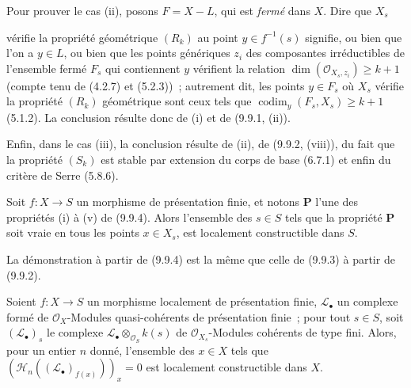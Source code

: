Pour prouver le cas (ii), posons $F=X-L$, qui est \emph{fermé} dans $X$. Dire
que $X_s$


vérifie la propriété géométrique $(R_k)$ au point $y\in f^{-1}(s)$ signifie, ou
bien que l'on a $y\in L$, ou bien que les points génériques $z_i$ des
composantes irréductibles de l'ensemble fermé $F_s$ qui contiennent $y$
vérifient la relation $\dim(\mathcal O_{X_s,z_i})\geq k+1$ (compte tenu de
(4.2.7) et (5.2.3))~; autrement dit, les points $y\in F_s$ où $X_s$ vérifie la
propriété $(R_k)$ géométrique sont ceux tels que
$\operatorname{codim}_y(F_s,X_s)\geq k+1$ (5.1.2). La conclusion résulte donc
de (i) et de (9.9.1, (ii)).

Enfin, dans le cas (iii), la conclusion résulte de (ii), de (9.9.2, (viii)), du
fait que la propriété $(S_k)$ est stable par extension du corps de base (6.7.1)
et enfin du critère de Serre (5.8.6).

\begin{corollary}[9.9.5]
\label{IV.9.9.5-fr}
Soit $f:X\to S$ un morphisme de présentation finie, et notons $\mathbf P$
l'une des propriétés (i) à (v) de (9.9.4). Alors l'ensemble des $s\in S$ tels
que la propriété $\mathbf P$ soit vraie en tous les points $x\in X_s$, est
localement constructible dans $S$.
\end{corollary}

La démonstration à partir de (9.9.4) est la même que celle de (9.9.3) à partir
de (9.9.2).

\begin{proposition}[9.9.6]
\label{IV.9.9.6-fr}
Soient $f:X\to S$ un morphisme localement de présentation finie,
$\mathcal L_\bullet$ un complexe formé de $\mathcal O_X$-Modules
quasi-cohérents de présentation finie~; pour tout $s\in S$, soit
$(\mathcal L_\bullet)_s$ le complexe
$\mathcal L_\bullet\otimes_{\mathcal O_S}k(s)$ de
$\mathcal O_{X_s}$-Modules cohérents de type fini. Alors, pour un entier $n$
donné, l'ensemble des $x\in X$ tels que
$(\mathcal H_n((\mathcal L_\bullet)_{f(x)}))_x=0$ est localement constructible
dans $X$.
\end{proposition}


